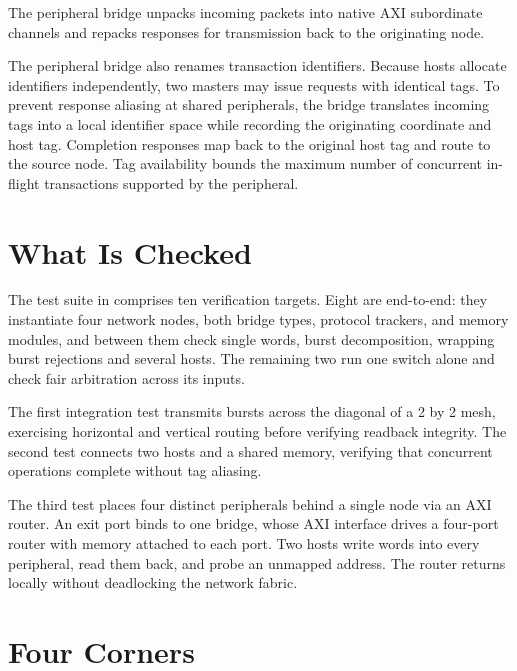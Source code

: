 \documentclass[journal,9pt]{IEEEtran}
\newcommand{\nocpart}[4]{%
}
\begin{document}
\nocpart{bridge.rs}{hostrun}{Host bridge implementation.}{lst:n-host}

The peripheral bridge unpacks incoming packets into native AXI subordinate
channels and repacks responses for transmission back to the originating node.

The peripheral bridge also renames transaction identifiers. Because hosts
allocate identifiers independently, two masters may issue requests with
identical tags. To prevent response aliasing at shared peripherals, the
bridge translates incoming tags into a local identifier space while recording
the originating coordinate and host tag. Completion responses map back to the
original host tag and route to the source node. Tag availability bounds the
maximum number of concurrent in-flight transactions supported by the
peripheral.

\nocpart{bridge.rs}{perrun}{Peripheral bridge implementation.}{lst:n-per}

\section{What Is Checked}
\label{sec:n-tests}

The test suite in  comprises ten verification targets. Eight
are end-to-end: they instantiate four network nodes, both bridge types,
protocol trackers, and memory modules, and between them check single
words, burst decomposition, wrapping burst rejections and several hosts.
The remaining two run one switch alone and check fair arbitration across
its inputs.

The first integration test transmits bursts across the diagonal of a 2 by 2
mesh, exercising horizontal and vertical routing before verifying readback
integrity. The second test connects two hosts and a shared memory, verifying
that concurrent operations complete without tag aliasing.

The third test places four distinct peripherals behind a single node via an
AXI router. An exit port binds to one bridge, whose AXI interface drives a
four-port router with memory attached to each port. Two hosts write words
into every peripheral, read them back, and probe an unmapped address. The
router returns  locally without deadlocking the network fabric.

\section{Four Corners}
\label{sec:n-soc}
\end{document}
